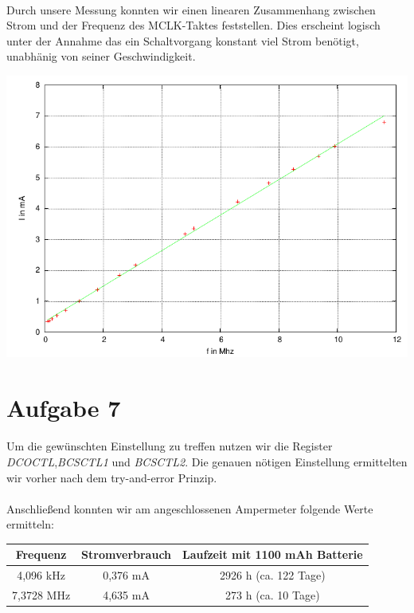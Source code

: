 \paragraph*{}
Durch unsere Messung konnten wir einen linearen Zusammenhang zwischen Strom und der Frequenz des MCLK-Taktes feststellen. Dies erscheint logisch unter der Annahme das ein Schaltvorgang konstant viel Strom benötigt, unabhänig von seiner Geschwindigkeit.

\includegraphics[width=\textwidth]{graphs/vfgraph.pdf}


\section*{Aufgabe 7}

\paragraph*{}
Um die gewünschten Einstellung zu treffen nutzen wir die Register {\em DCOCTL},{\em BCSCTL1} und {\em BCSCTL2}. Die genauen nötigen Einstellung ermittelten wir vorher nach dem try-and-error Prinzip.



\paragraph*{}
Anschließend konnten wir am angeschlossenen Ampermeter folgende Werte ermitteln: \\

\begin{tabular}{ c | c | c }\hline \hline
Frequenz & Stromverbrauch & Laufzeit mit 1100 mAh Batterie \\ \hline
4,096 kHz & 0,376 mA & 2926 h (ca. 122 Tage) \\ \hline
7,3728 MHz & 4,635 mA & 273 h (ca. 10 Tage) \\ \hline
\end{tabular}

